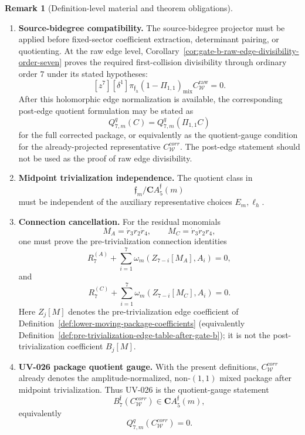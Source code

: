 \documentclass[11pt,a4paper]{amsart}
\def\corr{corr}%
\theoremstyle{plain}
\theoremstyle{definition}
\newtheorem{remark}[theorem]{Remark}
\newcommand{\corr}{\mathrm{corr}}
\begin{document}
\begin{remark}[Definition-level material and theorem obligations]
\begin{enumerate}
The remaining obligation is not to re-prove the leading cubic or
higher-transfer audits, but to ensure that the hypotheses of
Corollary~\ref{cor:gate-b-raw-edge-divisibility-order-seven} are part of
the actual corrected source package, and to extend the edge law if a
later argument requires orders beyond \(7\).

\item \textbf{Source-bidegree compatibility.}
The source-bidegree projector must be applied before fixed-sector
coefficient extraction, determinant pairing, or quotienting.  At the raw
edge level, Corollary~\ref{cor:gate-b-raw-edge-divisibility-order-seven}
proves the required first-collision divisibility through ordinary order
\(7\) under its stated hypotheses:
\[
[z^7][\delta^1]\pi_{\mathfrak f_h}
(1-\Pi_{1,1})_{\mathrm{mix}}C_{\mathcal W}^{\mathrm{raw}}=0.
\]
After this holomorphic edge normalization is available, the corresponding
post-edge quotient formulation may be stated as
\[
Q_{7,m}^q(C)=Q_{7,m}^q(\Pi_{1,1}C)
\]
for the full corrected package, or equivalently as the quotient-gauge
condition for the already-projected representative
\(C_{\mathcal W}^{\corr}\).  The post-edge statement should not be used as
the proof of raw edge divisibility.

\item \textbf{Midpoint trivialization independence.}
The quotient class in
\[
\mathfrak f_m/\mathbf C A_5^{\mathfrak f}(m)
\]
must be independent of the auxiliary representative choices \(E_m,\ell_h\).

\item \textbf{Connection cancellation.}
For the residual monomials
\[
M_A=\dot r_3r_2\dot r_4,
\qquad
M_C=\dot r_3\dot r_2r_4,
\]
one must prove the pre-trivialization connection identities
\[
R_7^{(A)}
+
\sum_{i=1}^{7}\omega_m(Z_{7-i}[M_A],A_i)
=
0,
\]
and
\[
R_7^{(C)}
+
\sum_{i=1}^{7}\omega_m(Z_{7-i}[M_C],A_i)
=
0.
\]
Here \(Z_j[M]\) denotes the pre-trivialization edge coefficient of
Definition~\ref{def:lower-moving-package-coefficients}
(equivalently Definition~\ref{def:pre-trivialization-edge-table-after-gate-b});
it is not the post-trivialization coefficient \(B_j[M]\).

\item \textbf{UV-026 package quotient gauge.}
With the present definitions, \(C_{\mathcal W}^{\corr}\) already denotes the
amplitude-normalized, non-\((1,1)\) mixed package after midpoint
trivialization.  Thus UV-026 is the quotient-gauge statement
\[
B_7^{\mathfrak f}(C_{\mathcal W}^{\corr})
\in
\mathbf C A_5^{\mathfrak f}(m),
\]
equivalently
\[
Q_{7,m}^q(C_{\mathcal W}^{\corr})=0.
\]


\end{enumerate}
\end{remark}
\end{document}
